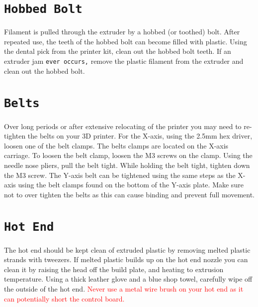 \section{\texttt{Hobbed Bolt}}
Filament is pulled through the extruder by a hobbed (or toothed) bolt. After repeated use, the teeth of the hobbed bolt can become filled with plastic. Using the dental pick from the printer kit, clean out the hobbed bolt teeth. If an extruder jam \texttt{ever occurs,} remove the plastic filament from the extruder and clean out the hobbed bolt.

\begin{comment}
\section{Software}
\index{software}
\index{download}
Aleph Objects, Inc. will release a new stable version of Cura LulzBot Edition, typically every quarter. It is best to update Cura every time a new version is released. Each software update can bring advances in print quality, reliability, and print times. The files are available at \texttt{http://lulzbot.com/cura}. You can also find updated software versions in the Download section at: \texttt{http://LulzBot.com/downloads}.
\end{comment}

\section{\texttt{Belts}}
Over long periods or after extensive relocating of the printer you may need to re-tighten the belts on your 3D printer. For the X-axis, using the 2.5mm hex driver, loosen one of the belt clamps. The belts clamps are located on the X-axis carriage. To loosen the belt clamp, loosen the M3 screws on the clamp. Using the needle nose pliers, pull the belt tight. While holding the belt tight, tighten down the M3 screw. The Y-axis belt can be tightened using the same steps as the X-axis using the belt clamps found on the bottom of the Y-axis plate. Make sure not to over tighten the belts as this can cause binding and prevent full movement.

\section{\texttt{Hot End}}
The hot end should be kept clean of extruded plastic by removing melted plastic strands with tweezers. If melted plastic builds up on the hot end nozzle you can clean it by raising the head off the build plate, and heating to extrusion temperature. Using a thick leather glove and a blue shop towel, carefully wipe off the outside of the hot end. \textcolor{red}{Never use a metal wire brush on your hot end as it can potentially short the control board.}

